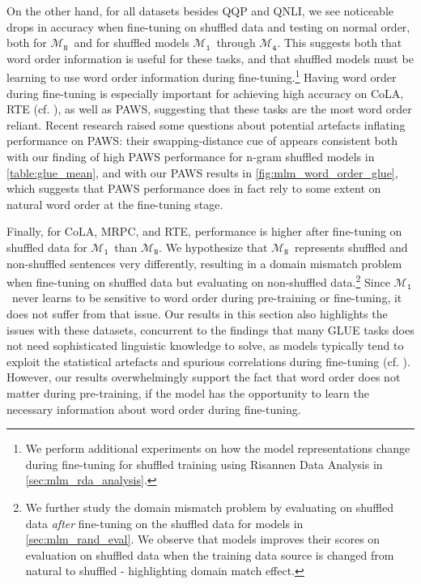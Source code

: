 \documentclass[letterpaper, 12pt]{report}
\newcommand{\OR}{$\mathcal{M}_{\texttt{N}}$}
\newcommand{\RI}{$\mathcal{M}_{\texttt{1}}$}
\newcommand{\RIV}{$\mathcal{M}_{\texttt{4}}$}
\begin{document}
On the other hand, for all datasets besides QQP and QNLI, we see noticeable drops in accuracy when fine-tuning on shuffled data and testing on normal order, both for \OR\ and for shuffled models \RI\ through \RIV.
This suggests both that word order information is useful for these tasks, and that shuffled models must be learning to use word order information during fine-tuning.\footnote{We perform additional experiments on how the model representations change during fine-tuning for shuffled training using Risannen Data Analysis in \autoref{sec:mlm_rda_analysis}.}
Having word order during fine-tuning is especially important for achieving high accuracy on CoLA, RTE (cf. \citealt{pham2020}), as well as PAWS,
suggesting that these tasks are the most word order reliant. Recent research \cite{yu-ettinger-2021-interplay} raised some questions about potential artefacts inflating performance on PAWS: their swapping-distance cue of appears consistent both with our finding of high PAWS performance for n-gram shuffled models in \autoref{table:glue_mean}, and with our PAWS results in \autoref{fig:mlm_word_order_glue}, which suggests that PAWS performance does in fact rely to some extent on natural word order  at the fine-tuning stage.

Finally, for CoLA, MRPC, and RTE, performance is higher after fine-tuning on shuffled data for \RI\ than \OR.
We hypothesize that \OR\ represents shuffled and non-shuffled sentences very differently, resulting in a domain mismatch problem when fine-tuning on shuffled data but evaluating on non-shuffled data.\footnote{We further study the domain mismatch problem by evaluating on shuffled data \textit{after} fine-tuning on the shuffled data for models in \autoref{sec:mlm_rand_eval}. We observe that models improves their scores on evaluation on shuffled data when the training data source is changed from natural to shuffled - highlighting domain match effect.} Since \RI\ never learns to be sensitive to word order during pre-training or fine-tuning, it does not suffer from that issue. Our results in this section also highlights the issues with these datasets, concurrent to the findings that many GLUE tasks does not need sophisticated linguistic knowledge to solve, as models typically tend to exploit the statistical artefacts and spurious correlations during fine-tuning (cf. \citealt{gururangan-etal-2018-annotation, poliak-etal-2018-hypothesis,tsuchiya-2018-performance,mccoy-etal-2019-right}). However, our results overwhelmingly support the fact that word order does not matter during pre-training, if the model has the opportunity to learn the necessary information about word order during fine-tuning.
\end{document}
